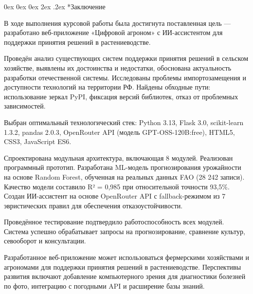 \documentclass[14pt, a4paper]{extarticle}
\makeatletter
\renewcommand\section{\@startsection {section}{1}{\z@}%
    {0ex \@plus 0ex \@minus 0ex}%
    {2ex \@plus.2ex}%
    {\centering\normalfont\Large\bfseries}}
\makeatother
\begin{document}

\newpage
\section*{Заключение}

    В ходе выполнения курсовой работы была достигнута поставленная цель — разработано веб-приложение «Цифровой агроном» с ИИ-ассистентом для поддержки принятия решений в растениеводстве.

    Проведён анализ существующих систем поддержки принятия решений в сельском хозяйстве, выявлены их достоинства и недостатки, обоснована актуальность разработки отечественной системы. Исследованы проблемы импортозамещения и доступности технологий на территории РФ. Найдены обходные пути: использование зеркал PyPI, фиксация версий библиотек, отказ от проблемных зависимостей.

    Выбран оптимальный технологический стек: Python 3.13, Flask 3.0, scikit-learn 1.3.2, pandas 2.0.3, OpenRouter API (модель GPT-OSS-120B:free), HTML5, CSS3, JavaScript ES6.

    Спроектирована модульная архитектура, включающая 8 модулей. Реализован программный прототип. Разработана ML-модель прогнозирования урожайности на основе Random Forest, обученная на реальных данных FAO (28 242 записи). Качество модели составило R² = 0,985 при относительной точности 93,5\%. Создан ИИ-ассистент на основе OpenRouter API с fallback-режимом из 7 эвристических правил для обеспечения отказоустойчивости.

    Проведённое тестирование подтвердило работоспособность всех модулей. Система успешно обрабатывает запросы на прогнозирование, сравнение культур, севооборот и консультации.

    Разработанное веб-приложение может использоваться фермерскими хозяйствами и агрономами для поддержки принятия решений в растениеводстве. Перспективы развития включают добавление компьютерного зрения для диагностики болезней по фото, интеграцию с погодными API и расширение базы знаний.

\end{document}
